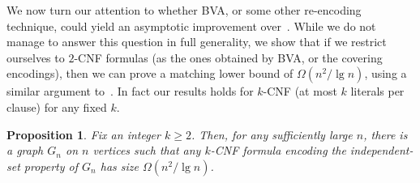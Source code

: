 \documentclass[11pt]{article}
\newtheorem{proposition}[theorem]{Proposition}
\begin{document}
We now turn our attention to whether BVA, or some other re-encoding technique, could yield an asymptotic improvement over~. While we do not manage to answer this question in full generality, we show that if we restrict ourselves to $2$-CNF formulas (as the ones obtained by BVA, or the covering encodings), then we can prove a matching lower bound of $\Omega(n^2 / \lg n)$, using a similar argument to~\citet[Theorem 1.7]{juknaComputationalComplexityGraphs2013}. In fact our results holds for $k$-CNF (at most $k$ literals per clause) for any fixed $k$.

\begin{proposition}\label{thm:lower_bound}
    Fix an integer $k \geq 2$. Then, for any sufficiently large $n$, there is a graph $G_n$ on $n$ vertices such that any $k$-CNF formula encoding the independent-set property of $G_n$ has size $\Omega(n^2 / \lg n)$.
\end{proposition}
\end{document}
